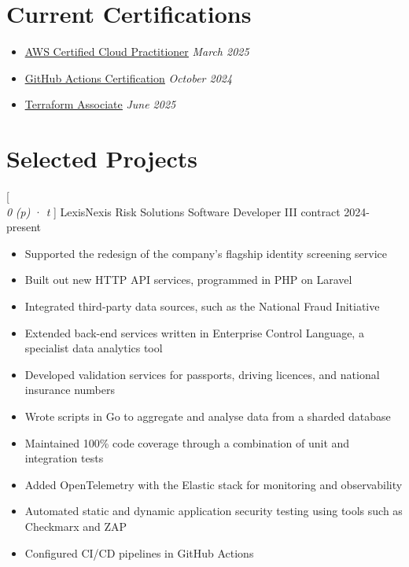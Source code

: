 \documentclass[a4paper,10pt]{article}
\newcommand{\link}[2]{
  \textcolor{link}{\uline{\href{#1}{#2}}}
}
\newcommand{\resumeHeading}[1]{
  \section*{#1}
}
\newcommand{\resumeSubheading}[5][12pt]{
  \vspace{#1}
  {\scshape{#2}} \\
  \textit{\small{#3}} \textit{\small{(#4)}} · \textit{\small{#5}}
  \vspace{2pt}
}
\newcommand{\resumeListStart}{\begin{itemize}}
\newcommand{\resumeListEnd}{\end{itemize}}
\newcommand{\resumeItem}[1]{
  \item[\-·]\small{{#1\vspace{1pt}}}
}
\begin{document}
  \begin{minipage}{\textwidth}
    \resumeHeading{Current Certifications}

    \resumeListStart
      \resumeItem{\link{https://www.credly.com/badges/9801eabb-75e4-4533-a63b-4560c0abae49/}{AWS Certified Cloud Practitioner} \hfill \textit{March 2025}}
      \resumeItem{\link{https://www.credly.com/badges/4ffff536-6b68-40b1-8686-5ffd7f548447/}{GitHub Actions Certification} \hfill \textit{October 2024}}
      \resumeItem{\link{https://www.credly.com/badges/d9545b08-5b05-48c8-af94-210981198d8c/}{Terraform Associate} \hfill \textit{June 2025}}
    \resumeListEnd
  \end{minipage}

  \begin{minipage}{\textwidth}
    \resumeHeading{Selected Projects}

    \resumeSubheading
      [0pt]  %
      {LexisNexis Risk Solutions}
      {Software Developer III}
      {contract}
      {2024-present}
    \resumeListStart
      \resumeItem{Supported the redesign of the company's flagship identity screening service}
      \resumeItem{Built out new HTTP API services, programmed in PHP on Laravel}
      \resumeItem{Integrated third-party data sources, such as the National Fraud Initiative}
      \resumeItem{Extended back-end services written in Enterprise Control Language, a specialist data analytics tool}
      \resumeItem{Developed validation services for passports, driving licences, and national insurance numbers}
      \resumeItem{Wrote scripts in Go to aggregate and analyse data from a sharded database}
      \resumeItem{Maintained 100\% code coverage through a combination of unit and integration tests}
      \resumeItem{Added OpenTelemetry with the Elastic stack for monitoring and observability}
      \resumeItem{Automated static and dynamic application security testing using tools such as Checkmarx and ZAP}
      \resumeItem{Configured CI/CD pipelines in GitHub Actions}
    \resumeListEnd
  \end{minipage}

\end{document}
